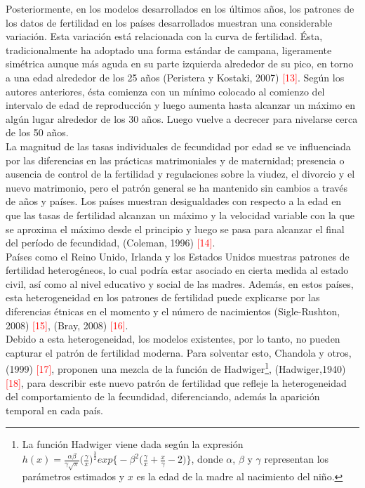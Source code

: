 Posteriormente, en los modelos desarrollados en los últimos años, los patrones de los datos de fertilidad en los países desarrollados muestran una considerable variación. Esta variación está relacionada con la curva de fertilidad. Ésta, tradicionalmente ha adoptado una forma estándar de campana, ligeramente simétrica aunque más aguda en su parte izquierda alrededor de su pico, en torno a una edad alrededor de los 25 años (Peristera y Kostaki, 2007) \textcolor{red}{[13]}. Según los autores anteriores, ésta comienza con un mínimo colocado al comienzo del intervalo de edad de reproducción y luego aumenta hasta alcanzar un máximo en algún lugar alrededor de los 30 años. Luego vuelve a decrecer para nivelarse cerca de los 50 años.\\
La magnitud de las tasas individuales de fecundidad por edad se ve influenciada por las diferencias en las prácticas matrimoniales y de maternidad; presencia o ausencia de control de la fertilidad y regulaciones sobre la viudez, el divorcio y el nuevo matrimonio, pero el patrón general se ha mantenido sin cambios a través de años y países. Los países muestran desigualdades con respecto a la edad en que las tasas de fertilidad alcanzan un máximo y la velocidad variable con la que se aproxima el máximo desde el principio y luego se pasa para alcanzar el final del período de fecundidad, (Coleman, 1996) \textcolor{red}{[14]}.\\

Países como el Reino Unido, Irlanda y los Estados Unidos muestras patrones de fertilidad heterogéneos, lo cual podría estar asociado en cierta medida al estado civil, así como al nivel educativo y social de las madres. Además, en estos países, esta heterogeneidad en los patrones de fertilidad puede explicarse por las diferencias étnicas en el momento y el número de nacimientos (Sigle-Rushton, 2008) \textcolor{red}{[15]}, (Bray, 2008) \textcolor{red}{[16]}.\\ 

Debido a esta heterogeneidad, los modelos existentes, por lo tanto, no pueden capturar el patrón de fertilidad moderna. Para solventar esto, Chandola y otros, (1999) \textcolor{red}{[17]}, proponen una mezcla de la función de Hadwiger\footnote{La función Hadwiger viene dada según la expresión $h(x)=\frac{\alpha\beta}{\gamma\sqrt{\pi}}\big(\frac{\gamma}{x}\big)^{\frac{3}{2}}exp\big\{-\beta^{2}\big(\frac{\gamma}{x}+\frac{x}{\gamma}-2\big)\big\}$, donde $\alpha$, $\beta$ y $\gamma$ representan los parámetros estimados y $x$ es la edad de la madre al nacimiento del niño.}, (Hadwiger,1940) \textcolor{red}{[18]}, para describir este nuevo patrón de fertilidad que refleje la heterogeneidad del comportamiento de la fecundidad, diferenciando, además la aparición temporal en cada país.\\

